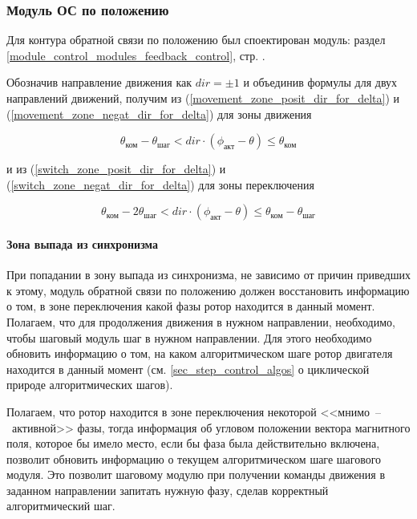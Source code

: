 \subsubsection{Модуль ОС по положению}
Для контура обратной связи по положению был споектирован модуль:
раздел \ref{module_control_modules_feedback_control},
стр. \pageref{module_control_modules_feedback_control}.

Обозначив направление движения как $\textit{dir} = \pm 1$ и объединив формулы
для двух направлений движений, получим из (\ref{movement_zone_posit_dir_for_delta})
и (\ref{movement_zone_negat_dir_for_delta}) для зоны движения

\begin{equation}
    \label{movement_zone_for_delta}
    \theta_\textit{ком} - \theta_\textit{шаг}
    < dir \cdot (\phi_\textit{акт} - \theta)
    \leq \theta_\textit{ком}
\end{equation}

и из (\ref{switch_zone_posit_dir_for_delta})
и (\ref{switch_zone_negat_dir_for_delta}) для зоны переключения

\begin{equation}
    \label{switch_zone_for_delta}
    \theta_\textit{ком} - 2\theta_\textit{шаг}
    < dir \cdot (\phi_\textit{акт} - \theta)
    \leq \theta_\textit{ком} - \theta_\textit{шаг}
\end{equation}

\paragraph{Зона выпада из синхронизма}
При попадании в зону выпада из синхронизма, не зависимо от причин приведших к этому,
модуль обратной связи по положению должен восстановить информацию о том,
в зоне переключения какой фазы ротор находится в данный момент. Полагаем, что для
продолжения движения в нужном направлении, необходимо, чтобы шаговый модуль
шаг в нужном направлении. Для этого необходимо обновить информацию о том, на каком
алгоритмическом шаге ротор двигателя находится в данный момент
(см. \ref{sec_step_control_algos} о циклической природе алгоритмических шагов).

Полагаем, что ротор находится в зоне переключения некоторой <<мнимо~--~активной>> фазы,
тогда информация об угловом положении вектора магнитного поля, которое бы имело место,
если бы фаза была действительно включена, позволит обновить информацию о текущем
алгоритмическом шаге шагового модуля. Это позволит шаговому модулю при получении
команды движения в заданном направлении запитать нужную фазу, сделав корректный
алгоритмический шаг.

